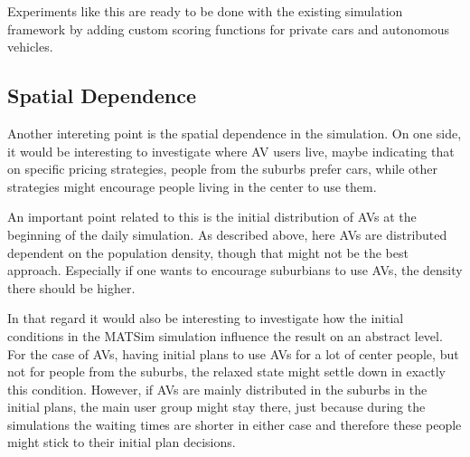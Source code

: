 Experiments like this are ready to be done with the existing simulation framework
by adding custom scoring functions for private cars and autonomous vehicles.

\subsection{Spatial Dependence}

Another intereting point is the spatial dependence in the simulation. On one side,
it would be interesting to investigate where AV users live, maybe indicating that
on specific pricing strategies, people from the suburbs prefer cars, while other
strategies might encourage people living in the center to use them.

An important point related to this is the initial distribution of AVs at the beginning
of the daily simulation. As described above, here AVs are distributed dependent on
the population density, though that might not be the best approach. Especially
if one wants to encourage suburbians to use AVs, the density there should be higher.

In that regard it would also be interesting to investigate how the initial conditions
in the MATSim simulation influence the result on an abstract level. For the case of
AVs, having initial plans to use AVs for a lot of center people, but not for people
from the suburbs, the relaxed state might settle down in exactly this condition.
However, if AVs are mainly distributed in the suburbs in the initial plans, the
main user group might stay there, just because during the simulations the waiting
times are shorter in either case and therefore these people might stick to their
initial plan decisions.
